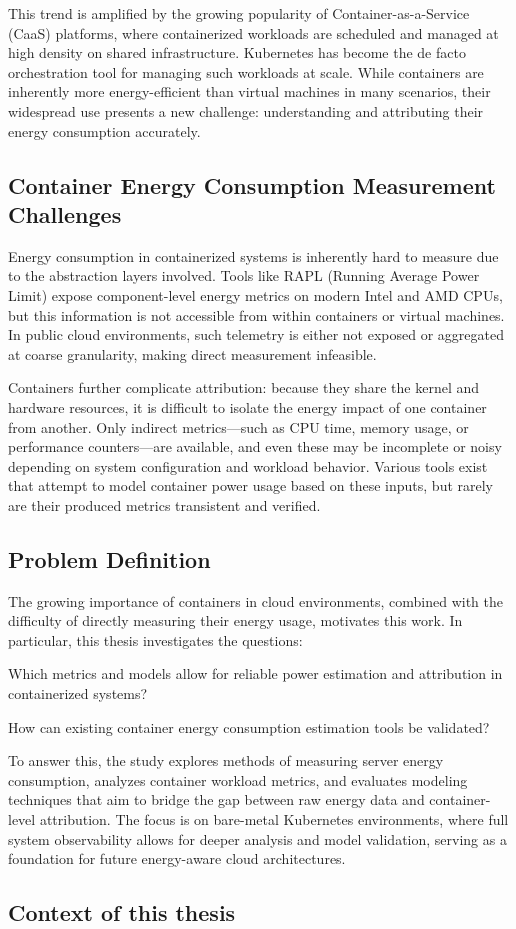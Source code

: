 This trend is amplified by the growing popularity of Container-as-a-Service (CaaS) platforms, where containerized workloads are scheduled and managed at high density on shared infrastructure. Kubernetes has become the de facto orchestration tool for managing such workloads at scale. While containers are inherently more energy-efficient than virtual machines in many scenarios\parencite{Morabito2015}, their widespread use presents a new challenge: understanding and attributing their energy consumption accurately.

\subsection{Container Energy Consumption Measurement Challenges}

Energy consumption in containerized systems is inherently hard to measure due to the abstraction layers involved. Tools like RAPL (Running Average Power Limit) expose component-level energy metrics on modern Intel and AMD CPUs, but this information is not accessible from within containers or virtual machines. In public cloud environments, such telemetry is either not exposed or aggregated at coarse granularity, making direct measurement infeasible.

Containers further complicate attribution: because they share the kernel and hardware resources, it is difficult to isolate the energy impact of one container from another. Only indirect metrics—such as CPU time, memory usage, or performance counters—are available, and even these may be incomplete or noisy depending on system configuration and workload behavior. Various tools exist that attempt to model container power usage based on these inputs, but rarely are their produced metrics transistent and verified.

\subsection{Problem Definition}

The growing importance of containers in cloud environments, combined with the difficulty of directly measuring their energy usage, motivates this work. In particular, this thesis investigates the questions:

Which metrics and models allow for reliable power estimation and attribution in containerized systems?

How can existing container energy consumption estimation tools be validated?

To answer this, the study explores methods of measuring server energy consumption, analyzes container workload metrics, and evaluates modeling techniques that aim to bridge the gap between raw energy data and container-level attribution. The focus is on bare-metal Kubernetes environments, where full system observability allows for deeper analysis and model validation, serving as a foundation for future energy-aware cloud architectures.

\subsection{Context of this thesis}